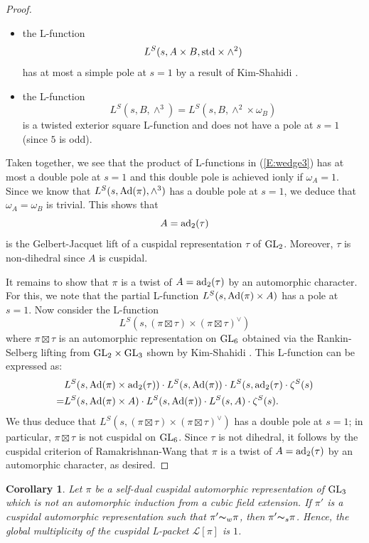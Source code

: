 \documentclass[11pt]{amsart}
\theoremstyle{plain}
\newtheorem{cor}[equation]{Corollary}
\numberwithin{equation}{section}
\def\GL{{\rm GL}}
\begin{document}
\begin{proof}
\begin{itemize}
\item the L-function
\[  L^S(s, A \times B, {\rm std} \times \wedge^2) \]
has at most a simple pole at $s=1$ by a result of Kim-Shahidi \cite[Thm. 1(b) and Remark 1]{KS3}.

\item the L-function
\[ L^S(s, B, \wedge^3) = L^S(s, B, \wedge^2 \times \omega_{B}) \]
is a twisted exterior square L-function and does not have a pole at $s=1$ (since $5$ is odd).
\end{itemize}
Taken together, we see that the product of L-functions in (\ref{E:wedge3}) has at most a double pole at $s=1$ and this double pole is achieved ionly if $\omega_{A} = 1$.
Since we know that $L^S(s, {\rm Ad}(\pi), \wedge^3)$ has a double pole  at $s=1$, we deduce that $\omega_{A} = \omega_{B}$ is trivial. This shows that 
\[ A = {\rm ad}_2(\tau) \]
 is the  Gelbert-Jacquet lift of a cuspidal representation $\tau$ of $\GL_2$. Moreover, $\tau$ is non-dihedral since $A$ is cuspidal.
\vskip 5pt

It remains to show that $\pi$ is a twist of $A = {\rm ad}_2(\tau)$ by an automorphic character. For this, we note that the partial L-function
$L^S(s, {\rm Ad}(\pi) \times A)$  has a  pole at $s=1$. Now consider the L-function
\[ L^S(s, (\pi \boxtimes \tau) \times (\pi \boxtimes \tau)^{\vee}) \]
where $\pi \boxtimes \tau$ is an automorphic representation on $\GL_6$ obtained via the  Rankin-Selberg lifting from $\GL_2 \times \GL_3$ shown by Kim-Shahidi \cite{KS1}.
This L-function can be expressed as:
\begin{align}
  &L^S(s, {\rm Ad}(\pi) \times {\rm ad}_2(\tau)) \cdot L^S(s, {\rm Ad}(\pi)) \cdot  L^S(s, {\rm ad}_2(\tau) \cdot \zeta^S(s)  \notag \\
  = &L^S(s, {\rm Ad}(\pi) \times A) \cdot L^S(s, {\rm Ad}(\pi)) \cdot L^S(s,A) \cdot \zeta^S(s). \notag
  \end{align}
  We thus deduce that $ L^S(s, (\pi \boxtimes \tau) \times (\pi \boxtimes \tau)^{\vee})$ has a double pole at $s=1$; in particular, $\pi \boxtimes \tau$ is not cuspidal on $\GL_6$.
  Since $\tau$ is not dihedral, it follows by the cuspidal criterion of Ramakrishnan-Wang \cite[Thm. 3.1(a)]{RW} that $\pi$ is a twist of $A = {\rm ad}_2(\tau)$ by an automorphic character, as desired.
\end{proof}
\vskip 5pt

\begin{cor}
Let $\pi$ be a self-dual cuspidal automorphic representation of $\GL_3$ which is not an automorphic induction from a cubic field extension. If $\pi'$ is a cuspidal automorphic representation such that $\pi' {\thicksim}_w \pi$, then $\pi' {\thicksim}_s \pi$.
Hence, the global multiplicity of the cuspidal  L-packet $\mathcal{L}[\pi]$ is $1$. 
\end{cor}
\vskip 5pt
\end{document}
